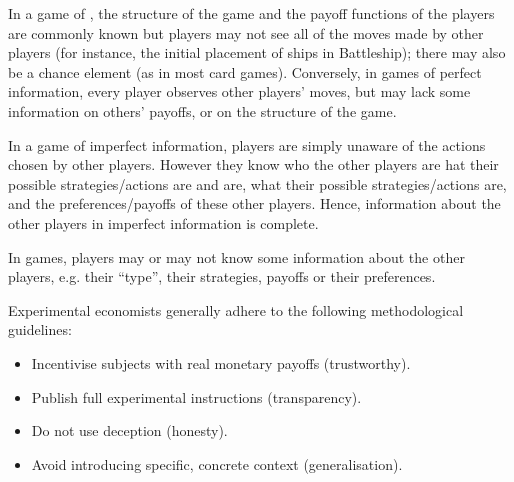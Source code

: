 \begin{definition}
	In a game of , the structure of the game and the payoff functions of the players are commonly known but players may not see all of the moves made by other players (for instance, the initial placement of ships in Battleship); there may also be a chance element (as in most card games). Conversely, in games of perfect information, every player observes other players' moves, but may lack some information on others' payoffs, or on the structure of the game.
\end{definition}

\begin{remark}  
In a game of imperfect information, players are simply unaware of the actions chosen by other
players. However they know who the other players are hat their possible strategies/actions are and are, what their possible strategies/actions are, and the preferences/payoffs of these other players. Hence, information about the other players in imperfect information is complete.

In  games, players may or may not know some information about the other players, e.g. their “type”, their strategies, payoffs or their preferences.	
\end{remark}

\begin{prop} 
Experimental economists generally adhere to the following methodological guidelines:
	\begin{itemize}
		\item Incentivise subjects with real monetary payoffs (trustworthy).
		\item Publish full experimental instructions (transparency).
		\item Do not use deception (honesty).
		\item Avoid introducing specific, concrete context (generalisation).
	\end{itemize}
\end{prop}


\newpage